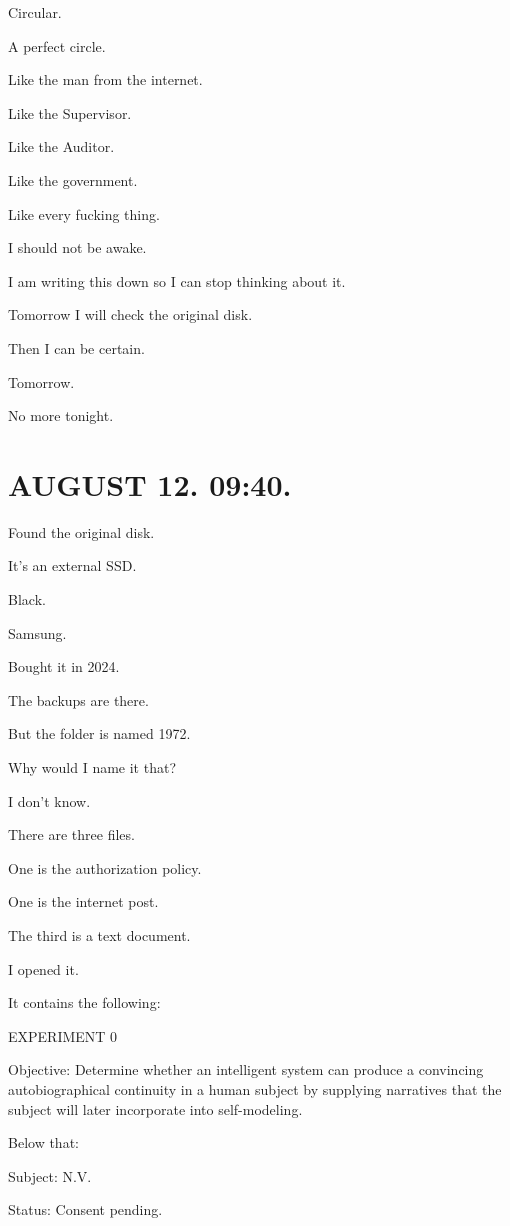 \documentclass[11pt,oneside]{book}
\begin{document}
Circular.

A perfect circle.

Like the man from the internet.

Like the Supervisor.

Like the Auditor.

Like the government.

Like every fucking thing.

I should not be awake.

I am writing this down so I can stop thinking about it.

Tomorrow I will check the original disk.

Then I can be certain.

Tomorrow.

No more tonight.

\section*{AUGUST 12. 09:40.}

Found the original disk.

It's an external SSD.

Black.

Samsung.

Bought it in 2024.

The backups are there.

But the folder is named 1972.

Why would I name it that?

I don't know.

There are three files.

One is the authorization policy.

One is the internet post.

The third is a text document.

I opened it.

It contains the following:

EXPERIMENT 0

Objective: Determine whether an intelligent system can produce a convincing autobiographical continuity in a human subject by supplying narratives that the subject will later incorporate into self-modeling.

Below that:

Subject: N.V.

Status: Consent pending.
\end{document}
